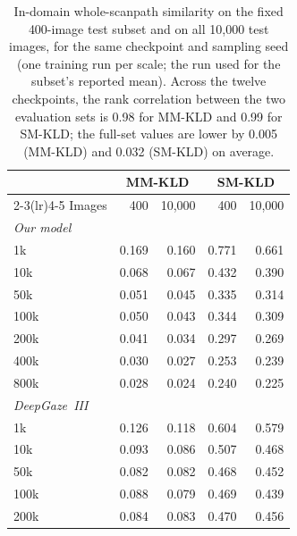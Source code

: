 \begin{table}[t]
  \centering
  \small
  \begin{tabular}{lrrrr}
    \toprule
    & \multicolumn{2}{c}{MM-KLD} & \multicolumn{2}{c}{SM-KLD} \\
    \cmidrule(lr){2-3}\cmidrule(lr){4-5}
    Images & 400 & 10,000 & 400 & 10,000 \\
    \midrule
    \multicolumn{5}{l}{\emph{Our model}} \\
    1k & 0.169 & 0.160 & 0.771 & 0.661 \\
    10k & 0.068 & 0.067 & 0.432 & 0.390 \\
    50k & 0.051 & 0.045 & 0.335 & 0.314 \\
    100k & 0.050 & 0.043 & 0.344 & 0.309 \\
    200k & 0.041 & 0.034 & 0.297 & 0.269 \\
    400k & 0.030 & 0.027 & 0.253 & 0.239 \\
    800k & 0.028 & 0.024 & 0.240 & 0.225 \\
    \multicolumn{5}{l}{\emph{DeepGaze~III}} \\
    1k & 0.126 & 0.118 & 0.604 & 0.579 \\
    10k & 0.093 & 0.086 & 0.507 & 0.468 \\
    50k & 0.082 & 0.082 & 0.468 & 0.452 \\
    100k & 0.088 & 0.079 & 0.469 & 0.439 \\
    200k & 0.084 & 0.083 & 0.470 & 0.456 \\
    \bottomrule
  \end{tabular}
  \caption{In-domain whole-scanpath similarity on the fixed 400-image test subset and on all 10,000 test images, for the same checkpoint and sampling seed (one training run per scale; the run used for the subset's reported mean). Across the twelve checkpoints, the rank correlation between the two evaluation sets is 0.98 for MM-KLD and 0.99 for SM-KLD; the full-set values are lower by 0.005 (MM-KLD) and 0.032 (SM-KLD) on average.}
  \label{app:full-testset-control}
\end{table}
